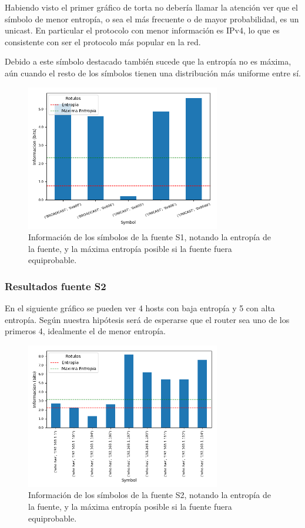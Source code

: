 Habiendo visto el primer gráfico de torta no debería llamar la atención ver que el símbolo de menor entropía, o sea el más frecuente o de mayor probabilidad, es un unicast. En particular el protocolo con menor información es IPv4, lo que es consistente con ser el protocolo más popular en la red.

Debido a este símbolo destacado también sucede que la entropía no es máxima, aún cuando el resto de los símbolos tienen una distribución más uniforme entre sí.

\begin{figure}[H]
 \centering
 \includegraphics[width=8.5cm]{figs/information_hogar_ethernet_S1_output.png}
 \caption{\normalfont Información de los símbolos de la fuente S1, notando la entropía de la fuente, y la máxima entropía posible si la fuente fuera equiprobable.}
\end{figure}

\subsubsection*{Resultados fuente S2}

En el siguiente gráfico se pueden ver 4 hosts con baja entropía y 5 con alta entropía. Según nuestra hipótesis será de esperarse que el router sea uno de los primeros 4, idealmente el de menor entropía.

\begin{figure}[H]
 \centering
 \includegraphics[width=8.5cm]{figs/information_hogar_ethernet_S2_output.png}
 \caption{\normalfont Información de los símbolos de la fuente S2, notando la entropía de la fuente, y la máxima entropía posible si la fuente fuera equiprobable.}
\end{figure}


